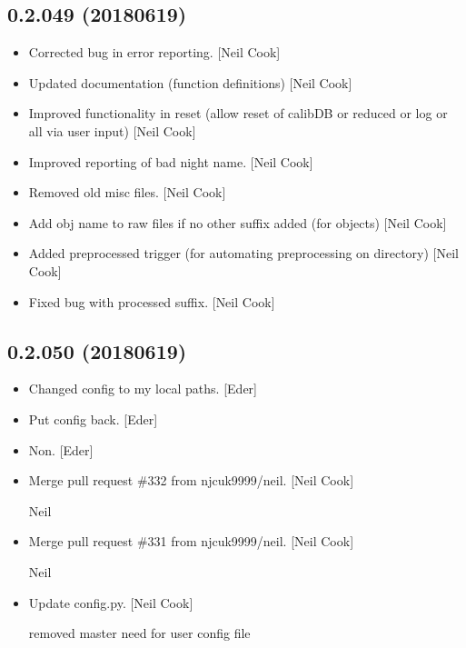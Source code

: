 \documentclass[a4paper,10pt,english]{report}
\begin{document}
\subsection{0.2.049 (2018\sphinxhyphen{}06\sphinxhyphen{}19)}
\label{\detokenize{misc/changelog:id434}}\begin{itemize}
\item {} 
Corrected bug in  error reporting. {[}Neil Cook{]}

\item {} 
Updated documentation (function definitions) {[}Neil Cook{]}

\item {} 
Improved functionality in reset (allow reset of calibDB or reduced or
log or all via user input) {[}Neil Cook{]}

\item {} 
Improved reporting of bad night name. {[}Neil Cook{]}

\item {} 
Removed old misc files. {[}Neil Cook{]}

\item {} 
Add obj name to raw files if no other suffix added (for objects) {[}Neil
Cook{]}

\item {} 
Added preprocessed trigger (for automating pre\sphinxhyphen{}processing on
 directory) {[}Neil Cook{]}

\item {} 
Fixed bug with processed suffix. {[}Neil Cook{]}

\end{itemize}


\subsection{0.2.050 (2018\sphinxhyphen{}06\sphinxhyphen{}19)}
\label{\detokenize{misc/changelog:id435}}\begin{itemize}
\item {} 
Changed config to my local paths. {[}Eder{]}

\item {} 
Put config back. {[}Eder{]}

\item {} 
Non. {[}Eder{]}

\item {} 
Merge pull request \#332 from njcuk9999/neil. {[}Neil Cook{]}

Neil

\item {} 
Merge pull request \#331 from njcuk9999/neil. {[}Neil Cook{]}

Neil

\item {} 
Update config.py. {[}Neil Cook{]}

removed master need for user config file

\end{itemize}
\end{document}

